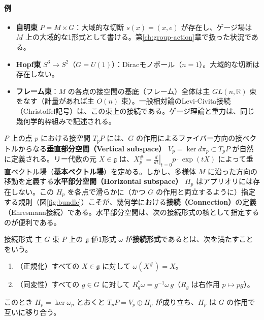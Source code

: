 \documentclass[uplatex, dvipdfmx, book]{jsbook}
\begin{document}
\paragraph{例}
\begin{itemize}
    \item \textbf{自明束} $P = M \times G$：大域的な切断 $s(x) = (x, e)$ が存在し、ゲージ場は $M$ 上の大域的な1形式として書ける。第\ref{ch:group-action}章で扱った状況である。
    \item \textbf{Hopf束} $S^3 \to S^2$（$G = U(1)$）：Diracモノポール（$n = 1$）。大域的な切断は存在しない。
    \item \textbf{フレーム束}：$M$ の各点の接空間の基底（フレーム）全体は主 $GL(n, \mathbb{R})$ 束をなす（計量があれば主 $O(n)$ 束）。一般相対論のLevi-Civita接続（Christoffel記号）は、この束上の接続である。ゲージ理論と重力は、同じ幾何学的枠組みで記述される。
\end{itemize}

$P$ 上の点 $p$ における接空間 $T_p P$ には、$G$ の作用によるファイバー方向の接ベクトルからなる\textbf{垂直部分空間（Vertical subspace）} $V_p = \ker d\pi_p \subset T_p P$ が自然に定義される。リー代数の元 $X \in \mathfrak{g}$ は、$X^\#_p = \left.\frac{d}{dt}\right|_{t=0} p \cdot \exp(tX)$ によって垂直ベクトル場（\textbf{基本ベクトル場}）を定める。しかし、多様体 $M$ に沿った方向の移動を定義する\textbf{水平部分空間（Horizontal subspace）} $H_p$ はアプリオリには存在しない。この $H_p$ を各点で滑らかに（かつ $G$ の作用と両立するように）指定する規則（図\ref{fig:bundle}）こそが、幾何学における\textbf{接続（Connection）}の定義（Ehresmann接続）である。水平部分空間は、次の接続形式の核として指定するのが便利である。

\begin{mydef}{接続形式}{}
主 $G$ 束 $P$ 上の $\mathfrak{g}$ 値1形式 $\omega$ が\textbf{接続形式}であるとは、次を満たすことをいう。
\begin{enumerate}
    \item （正規化）すべての $X \in \mathfrak{g}$ に対して $\omega(X^\#) = X$。
    \item （同変性）すべての $g \in G$ に対して $R_g^* \omega = g^{-1} \omega\, g$（$R_g$ は右作用 $p \mapsto pg$）。
\end{enumerate}
このとき $H_p = \ker \omega_p$ とおくと $T_p P = V_p \oplus H_p$ が成り立ち、$H_p$ は $G$ の作用で互いに移り合う。
\end{mydef}
\end{document}
